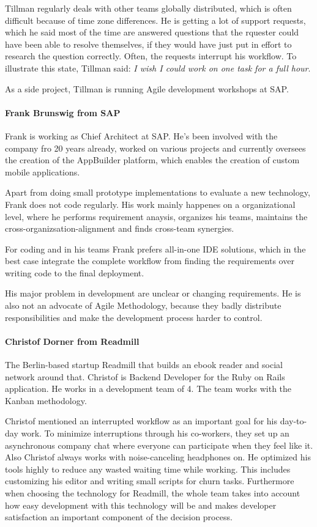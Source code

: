 Tillman regularly deals with other teams globally distributed, which is often difficult because of time zone differences. He is getting a lot of support requests, which he said most of the time are answered questions that the rquester could have been able to resolve themselves, if they would have just put in effort to research the question correctly. Often, the requests interrupt his workflow. To illustrate this state, Tillman said: \emph{I wish I could work on one task for a full hour}.

As a side project, Tillman is running Agile development workshops at SAP.

\paragraph{Frank Brunswig from SAP}
Frank is working as Chief Architect at SAP. He's been involved with the company fro 20 years already, worked on various projects and currently oversees the creation of the AppBuilder platform, which enables the creation of custom mobile applications.

Apart from doing small prototype implementations to evaluate a new technology, Frank does not code regularly. His work mainly happenes on a organizational level, where he performs requirement anaysis, organizes his teams, maintains the cross-organizsation-alignment and finds cross-team synergies.

For coding and in his teams Frank prefers all-in-one IDE solutions, which in the best case integrate the complete workflow from finding the requirements over writing code to the final deployment.

His major problem in development are unclear or changing requirements. He is also not an advocate of Agile Methodology, because they badly distribute responsibilities and make the development process harder to control.

\paragraph{Christof Dorner from Readmill}
The Berlin-based startup Readmill that builds an ebook reader and social network around that. Christof is Backend Developer for the Ruby on Rails application. He works in a development team of 4. The team works with the Kanban methodology.

Christof mentioned an interrupted workflow as an important goal for his day-to-day work. To minimize interruptions through his co-workers, they set up an asynchronous company chat where everyone can participate when they feel like it. Also Christof always works with noise-canceling headphones on. He optimized his tools highly to reduce any wasted waiting time while working. This includes customizing his editor and writing small scripts for churn tasks. Furthermore when choosing the technology for Readmill, the whole team takes into account how easy development with this technology will be and makes developer satisfaction an important component of the decision process.

